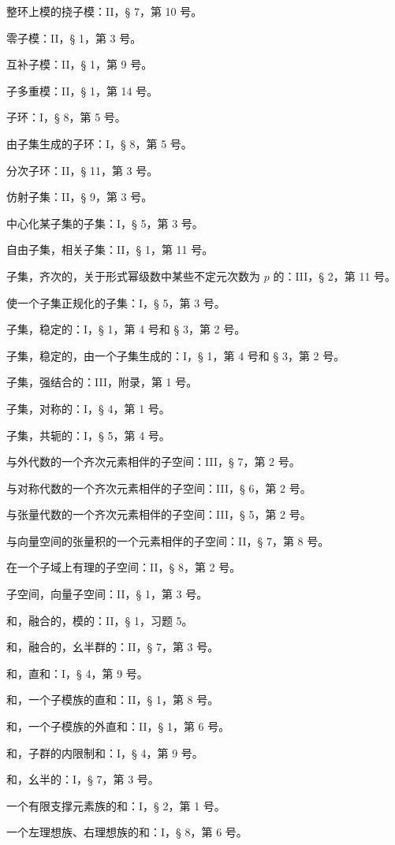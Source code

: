 整环上模的挠子模：II，§ 7，第 10 号。

零子模：II，§ 1，第 3 号。

互补子模：II，§ 1，第 9 号。

子多重模：II，§ 1，第 14 号。

子环：I，§ 8，第 5 号。

由子集生成的子环：I，§ 8，第 5 号。

分次子环：II，§ 11，第 3 号。

仿射子集：II，§ 9，第 3 号。

中心化某子集的子集：I，§ 5，第 3 号。

自由子集，相关子集：II，§ 1，第 11 号。

子集，齐次的，关于形式幂级数中某些不定元次数为 \(p\) 的：III，§ 2，第 11 号。

使一个子集正规化的子集：I，§ 5，第 3 号。

子集，稳定的：I，§ 1，第 4 号和 § 3，第 2 号。

子集，稳定的，由一个子集生成的：I，§ 1，第 4 号和 § 3，第 2 号。

子集，强结合的：III，附录，第 1 号。

子集，对称的：I，§ 4，第 1 号。

子集，共轭的：I，§ 5，第 4 号。

与外代数的一个齐次元素相伴的子空间：III，§ 7，第 2 号。

与对称代数的一个齐次元素相伴的子空间：III，§ 6，第 2 号。

与张量代数的一个齐次元素相伴的子空间：III，§ 5，第 2 号。

与向量空间的张量积的一个元素相伴的子空间：II，§ 7，第 8 号。

在一个子域上有理的子空间：II，§ 8，第 2 号。

子空间，向量子空间：II，§ 1，第 3 号。

和，融合的，模的：II，§ 1，习题 5。

和，融合的，幺半群的：II，§ 7，第 3 号。

和，直和：I，§ 4，第 9 号。

和，一个子模族的直和：II，§ 1，第 8 号。

和，一个子模族的外直和：II，§ 1，第 6 号。

和，子群的内限制和：I，§ 4，第 9 号。

和，幺半的：I，§ 7，第 3 号。

一个有限支撑元素族的和：I，§ 2，第 1 号。

一个左理想族、右理想族的和：I，§ 8，第 6 号。

